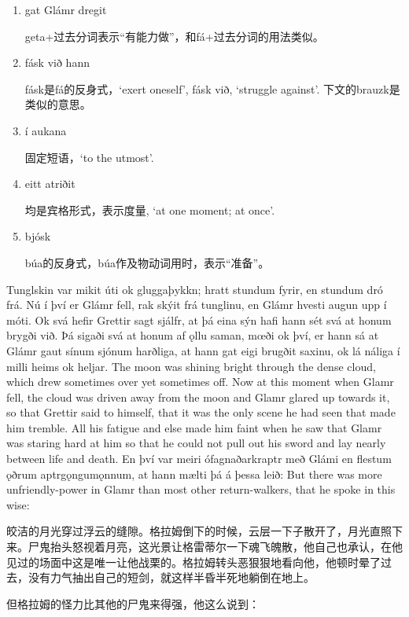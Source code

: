 \begin{grammar*}{}
    \begin{enumerate}[leftmargin=*]
        \item gat Glámr dregit

              geta+过去分词表示“有能力做”，和fá+过去分词的用法类似。

        \item fásk við hann

              fásk是fá的反身式，`exert oneself', fásk við, `struggle against'. 下文的brauzk是类似的意思。

        \item í aukana

              固定短语，`to the utmost'.

        \item eitt atriðit

              均是宾格形式，表示度量, `at one moment; at once'.

        \item bjósk

              búa的反身式，búa作及物动词用时，表示“准备”。
    \end{enumerate}
\end{grammar*}
\begin{paracol}{2}
    Tunglskin var mikit úti ok gluggaþykkn; hratt stundum fyrir, en stundum dró frá. Nú í því er Glámr fell, rak skýit frá tunglinu, en Glámr hvesti augun upp í móti. Ok svá hefir Grettir sagt sjálfr, at þá eina sýn hafi hann sét svá at honum brygði við. Þá sigaði svá at honum af ǫllu saman, mœði ok því, er hann sá at Glámr gaut sínum sjónum harðliga, at hann gat eigi brugðit saxinu, ok lá náliga í milli heims ok heljar.
    \switchcolumn
    The moon was shining bright through the dense cloud, which drew sometimes over yet sometimes off. Now at this moment when Glamr fell, the cloud was driven away from the moon and Glamr glared up towards it, so that Grettir said to himself, that it was the only scene he had seen that made him tremble. All his fatigue and else made him faint when he saw that Glamr was staring hard at him so that he could not pull out his sword and lay nearly between life and death.
    \switchcolumn
    En því var meiri ófagnaðarkraptr með Glámi en flestum ǫðrum aptrgǫngumǫnnum, at hann mælti þá á þessa leið:
    \switchcolumn
    But there was more unfriendly-power in Glamr than most other return-walkers, that he spoke in this wise:
\end{paracol}
\begin{translation*}{}
    皎洁的月光穿过浮云的缝隙。格拉姆倒下的时候，云层一下子散开了，月光直照下来。尸鬼抬头怒视着月亮，这光景让格雷蒂尔一下魂飞魄散，他自己也承认，在他见过的场面中这是唯一让他战栗的。格拉姆转头恶狠狠地看向他，他顿时晕了过去，没有力气抽出自己的短剑，就这样半昏半死地躺倒在地上。

    但格拉姆的怪力比其他的尸鬼来得强，他这么说到：
\end{translation*}
